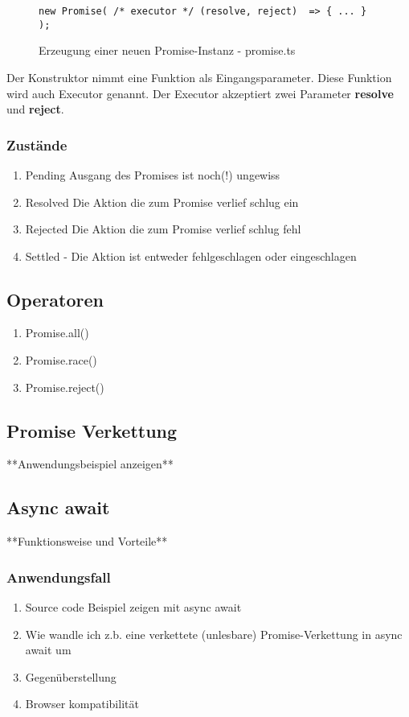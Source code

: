 \begin{figure}[h!]
\begin{lstlisting}
new Promise( /* executor */ (resolve, reject)  => { ... } );
\end{lstlisting}
\caption{Erzeugung einer neuen Promise-Instanz - promise.ts}
\end{figure}

Der Konstruktor nimmt eine Funktion als Eingangsparameter. Diese Funktion wird auch Executor genannt.\cite{promise-executor} Der Executor akzeptiert zwei Parameter \textbf{resolve} und \textbf{reject}.

\subsubsection{Zustände}

\begin{enumerate} 
\item Pending Ausgang des Promises ist noch(!) ungewiss
\item Resolved Die Aktion die zum Promise verlief schlug ein
\item Rejected Die Aktion die zum Promise verlief schlug fehl
\item Settled - Die Aktion ist entweder fehlgeschlagen oder eingeschlagen
\end{enumerate}

\subsection{Operatoren}

\begin{enumerate} 
\item Promise.all()
\item Promise.race() 
\item Promise.reject()
\end{enumerate}

\subsection{Promise Verkettung}
**Anwendungsbeispiel anzeigen**

\subsection{Async await}
**Funktionsweise und Vorteile**

\subsubsection{Anwendungsfall}

\begin{enumerate} 
\item Source code Beispiel zeigen mit async await
\item Wie wandle ich z.b. eine verkettete (unlesbare) Promise-Verkettung in async await um 
\item Gegenüberstellung
\item Browser kompatibilität
\end{enumerate}


